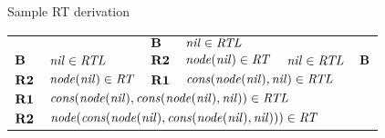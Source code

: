 \documentclass[style=sailor,size=12pt]{powerdot}
\begin{document}
\begin{wideslide}[bm=,toc=]{Sample RT derivation}

\begin{center}
\begin{tabular}{llllll}
 & & $\mbox{\bf B}$ & $\mbox{\it nil\/}\in\mbox{\it RTL\/}$ & & \\ \cline{4-4}
$\mbox{\bf B}$ & $\mbox{\it nil\/}\in\mbox{\it RTL\/}$ & $\mbox{\bf R2}$ & $\mbox{\it node\/}(\mbox{\it nil\/})\in\mbox{\it RT\/}$ & $\mbox{\it nil\/}\in\mbox{\it RTL\/}$ & $\mbox{\bf B}$ \\ 
\cline{2-2} \cline{4-5}
$\mbox{\bf R2}$ & $\mbox{\it node\/}(\mbox{\it nil\/})\in\mbox{\it RT\/}$ & $\mbox{\bf R1}$ & \multicolumn{2}{l}{
$\mbox{\it cons\/}(\mbox{\it node\/}(\mbox{\it nil\/}),\mbox{\it nil\/})\in\mbox{\it RTL\/}$} & \\
\cline{2-5}
$\mbox{\bf R1}$ & \multicolumn{4}{l}{$\mbox{\it cons\/}(\mbox{\it node\/}(\mbox{\it nil\/}),\mbox{\it cons\/}(\mbox{\it node\/}(\mbox{\it nil\/}),\mbox{\it nil\/})) \in \mbox{\it RTL\/}$} \\
\cline{2-5}
$\mbox{\bf R2}$ & \multicolumn{4}{l}{$\mbox{\it node\/}(\mbox{\it cons\/}(\mbox{\it node\/}(\mbox{\it nil\/}),\mbox{\it cons\/}(\mbox{\it node\/}(\mbox{\it nil\/}),\mbox{\it nil\/})))\in\mbox{\it RT\/}$}
\end{tabular}
\end{center}
\end{wideslide}
\end{document}
